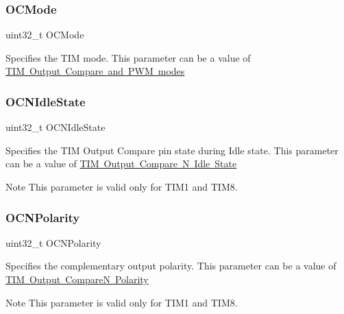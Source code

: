 \subsubsection{\texorpdfstring{O\+C\+Mode}{OCMode}}
{\footnotesize\ttfamily uint32\+\_\+t O\+C\+Mode}

Specifies the T\+IM mode. This parameter can be a value of \mbox{\hyperlink{group___t_i_m___output___compare__and___p_w_m__modes}{T\+IM Output Compare and P\+WM modes}} \mbox{\label{struct_t_i_m___o_c___init_type_def_a78d21970d78c1e3e328692743406ba25}} 
\subsubsection{\texorpdfstring{O\+C\+N\+Idle\+State}{OCNIdleState}}
{\footnotesize\ttfamily uint32\+\_\+t O\+C\+N\+Idle\+State}

Specifies the T\+IM Output Compare pin state during Idle state. This parameter can be a value of \mbox{\hyperlink{group___t_i_m___output___compare___n___idle___state}{T\+IM Output Compare N Idle State}} \begin{DoxyNote}{Note}
This parameter is valid only for T\+I\+M1 and T\+I\+M8. 
\end{DoxyNote}
\mbox{\label{struct_t_i_m___o_c___init_type_def_a978da9dd7cda80eb5fe8d04828b9bbcc}} 
\subsubsection{\texorpdfstring{O\+C\+N\+Polarity}{OCNPolarity}}
{\footnotesize\ttfamily uint32\+\_\+t O\+C\+N\+Polarity}

Specifies the complementary output polarity. This parameter can be a value of \mbox{\hyperlink{group___t_i_m___output___compare___n___polarity}{T\+IM Output CompareN Polarity}} \begin{DoxyNote}{Note}
This parameter is valid only for T\+I\+M1 and T\+I\+M8. 
\end{DoxyNote}
\mbox{\label{struct_t_i_m___o_c___init_type_def_a781c7dae9dec8b6c974b1bdf591b77e7}} 
